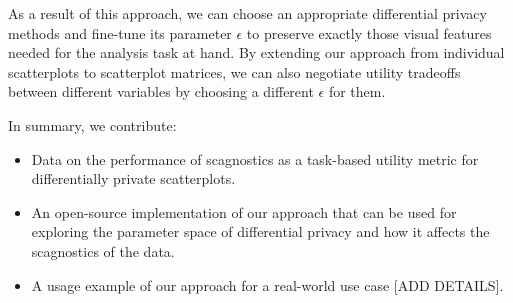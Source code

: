 \documentclass[journal]{vgtc}                     %
\begin{document}

As a result of this approach, we can choose an appropriate differential privacy methods and fine-tune its parameter $\epsilon$ to preserve exactly those visual features needed for the analysis task at hand.
By extending our approach from individual scatterplots to scatterplot matrices, we can also negotiate utility tradeoffs between different variables by choosing a different $\epsilon$ for them.

In summary, we contribute:
\begin{itemize}
\item Data on the performance of scagnostics as a task-based utility metric for differentially private scatterplots.
\item An open-source implementation of our approach that can be used for exploring the parameter space of differential privacy and how it affects the scagnostics of the data.
\item A usage example of our approach for a real-world use case [ADD DETAILS].
\end{itemize}

        

\end{document}
